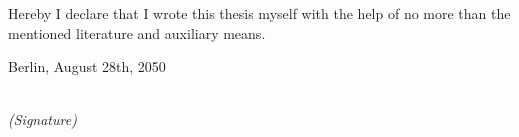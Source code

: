 \newpage

\thispagestyle{empty}

\begin{large}

\vspace*{6cm}

\noindent
Hereby I declare that I wrote this thesis myself with the help of no more than the mentioned literature and auxiliary means.
\vspace{2cm}

\noindent
Berlin, August 28th, 2050

\vspace{3cm}

\hspace*{7cm}%
\dotfill\\
\hspace*{8.5cm}%
\textit{(Signature)}

\end{large}
